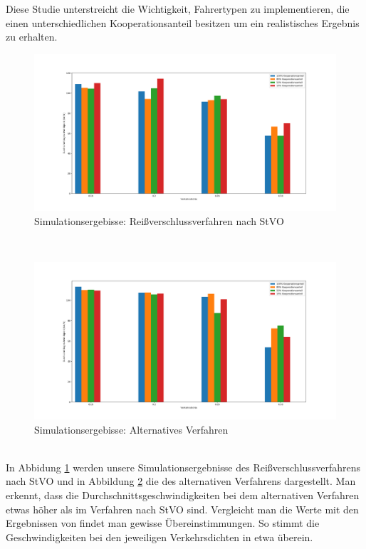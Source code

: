 Diese Studie unterstreicht die Wichtigkeit, Fahrertypen zu implementieren, die einen unterschiedlichen Kooperationsanteil besitzen um ein realistisches Ergebnis zu erhalten.
\begin{figure}
	\centering
	\includegraphics[width=\linewidth]{images/classic_merge}
	\caption{Simulationsergebisse: Reißverschlussverfahren nach StVO}
	\label{fig:classicmergenew}
\end{figure}\\
\begin{figure}
	\centering
	\includegraphics[width=\linewidth]{images/ne_merge}
	\caption{Simulationsergebisse: Alternatives Verfahren}
	\label{fig:nemerge}
\end{figure}\\
In Abbidung \ref{fig:classicmergenew} werden unsere Simulationsergebnisse des Reißverschlussverfahrens nach StVO und in Abbildung \ref{fig:nemerge} die des alternativen Verfahrens dargestellt. Man erkennt, dass die Durchschnittsgeschwindigkeiten bei dem alternativen Verfahren etwas höher als im Verfahren nach StVO sind. Vergleicht man die Werte mit den Ergebnissen von \cite{Benmimoun.2004} findet man gewisse Übereinstimmungen. So stimmt die Geschwindigkeiten bei den jeweiligen Verkehrsdichten in etwa überein. 
